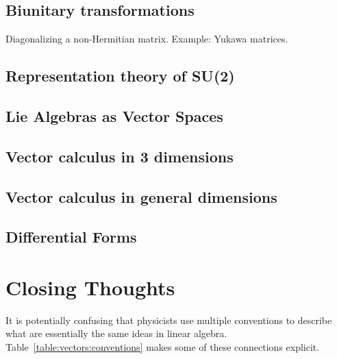 \documentclass[12pt, oneside]{report}    %
\let\oldsection\section
\def\section{%
  \setcounter{sidenote}{1}%
  \oldsection
}
\begin{document}
\section{Biunitary transformations}
Diagonalizing a non-Hermitian matrix. Example: Yukawa matrices.


\section{Representation theory of SU(2)}
\section{Lie Algebras as Vector Spaces}
\section{Vector calculus in 3 dimensions}
\section{Vector calculus in general dimensions}
\section{Differential Forms}


\chapter*{Closing Thoughts}


It is potentially confusing that physicists use multiple conventions to describe what are essentially the same ideas in linear algebra. Table~\ref{table:vectors:conventions} makes some of these connections explicit.
\end{document}
